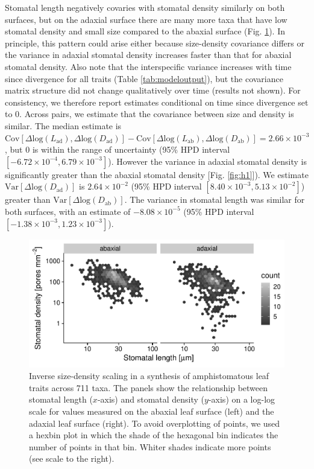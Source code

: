 \documentclass[
  10pt,
]{article}
\begin{document}
Stomatal length negatively covaries with stomatal density similarly on both surfaces, but on the adaxial surface there are many more taxa that have low stomatal density and small size compared to the abaxial surface (Fig. \ref{fig:h1_raw}). In principle, this pattern could arise either because size-density covariance differs or the variance in adaxial stomatal density increases faster than that for abaxial stomatal density. Also note that the interspecific variance increases with time since divergence for all traits (Table \ref{tab:modeloutput}), but the covariance matrix structure did not change qualitatively over time (results not shown). For consistency, we therefore report estimates conditional on time since divergence set to 0. Across pairs, we estimate that the covariance between size and density is similar. The median estimate is \(\text{Cov}[\Delta \text{log}(L_\text{ad}), \Delta \text{log}(D_\text{ad})] - \text{Cov}[\Delta \text{log}(L_\text{ab}), \Delta \text{log}(D_\text{ab})] = 2.66 \times 10^{-3}\), but 0 is within the range of uncertainty (95\% HPD interval \([-6.72 \times 10^{-4},6.79 \times 10^{-3}]\)). However the variance in adaxial stomatal density is significantly greater than the abaxial stomatal density {[}Fig. \ref{fig:h1}{]}). We estimate \(\text{Var}[\Delta \text{log}(D_\text{ad})]\) is \(2.64 \times 10^{-2}\) (95\% HPD interval \([8.40 \times 10^{-3},5.13 \times 10^{-2}]\)) greater than \(\text{Var}[\Delta \text{log}(D_\text{ab})]\). The variance in stomatal length was similar for both surfaces, with an estimate of \(-8.08 \times 10^{-5}\) (95\% HPD interval \([-1.38 \times 10^{-3},1.23 \times 10^{-3}]\)).

\begin{figure}[ht]
\includegraphics[width=\textwidth]{../figures/h1-raw.pdf}
\caption{Inverse size-density scaling in a synthesis of amphistomatous leaf traits across 711 taxa. The panels show the relationship between stomatal length ($x$-axis) and stomatal density ($y$-axis) on a log-log scale for values measured on the abaxial leaf surface (left) and the adaxial leaf surface (right). To avoid overplotting of points, we used a hexbin plot in which the shade of the hexagonal bin indicates the number of points in that bin. Whiter shades indicate more points (see scale to the right).}
\label{fig:h1_raw}
\end{figure}
\end{document}
